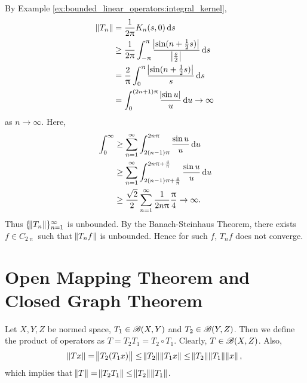 By Example \ref{ex:bounded_linear_operators:integral_kernel}, 
\begin{equation*}
    \begin{aligned}
        \norm{T_n} &= \frac{1}{2 \uppi} K_n(s, 0) \mathop{}\!\mathrm{d} s \\
        &\ge \frac{1}{2 \uppi} \int_{-\uppi}^{\uppi} 
            \frac{\abs{\sin (n+\frac{1}{2} s)}}{\abs{\frac{s}{2}}} \mathop{}\!\mathrm{d} s\\ 
        &= \frac{2}{\uppi} \int_{0}^{\uppi} 
            \frac{\abs{\sin (n + \frac{1}{2} s)}}{s} \mathop{}\!\mathrm{d} s \\
        &= \int_{0}^{(2n + 1) \uppi} \frac{\abs{\sin u}}{u} \mathop{}\!\mathrm{d} u \to \infty
    \end{aligned}
\end{equation*}
as $n \to \infty$. 
Here, 
\begin{equation*}
    \begin{aligned}
        \int_{0}^{\infty} &\ge \sum_{n=1}^{\infty} 
            \int_{2(n-1) \uppi}^{2n \uppi} \frac{\sin u}{u} \mathop{}\!\mathrm{d} u \\
        &\ge \sum_{n=1}^{\infty} 
            \int_{2(n-1) \uppi + \frac{4}{\uppi}}^{2n \uppi + \frac{4}{\uppi}} 
                \frac{\sin u}{u} \mathop{}\!\mathrm{d} u \\
        &\ge \frac{\sqrt{2}}{2} \sum_{n=1}^{\infty} 
            \frac{1}{2n \uppi} \frac{\uppi}{4} \to \infty. 
    \end{aligned}
\end{equation*}
Thus $\{ \norm{T_n} \}_{n=1}^{\infty}$ is unbounded. 
By the Banach-Steinhaus Theorem, there exists $f \in C_{2 \uppi}$ such that 
$\norm{T_n f}$ is unbounded. 
Hence for such $f$, $T_n f$ does not converge. 

\section{Open Mapping Theorem and Closed Graph Theorem}
Let $X, Y, Z$ be normed space, $T_1 \in \mathscr{B}(X, Y)$ and $T_2 \in \mathscr{B}(Y, Z)$. 
Then we define the product of operators as $T = T_2 T_1 = T_2 \circ T_1$. 
Clearly, $T \in \mathscr{B}(X, Z)$. 
Also, 
\begin{equation*}
    \begin{aligned}
        \norm{Tx} = \norm{T_2 (T_1 x)} 
        \le \norm{T_2} \norm{T_1 x} 
        \le \norm{T_2} \norm{T_1} \norm{x}, 
    \end{aligned}
\end{equation*}
which implies that $\norm{T} = \norm{T_2 T_1} \le \norm{T_2}\norm{T_1}$. 

